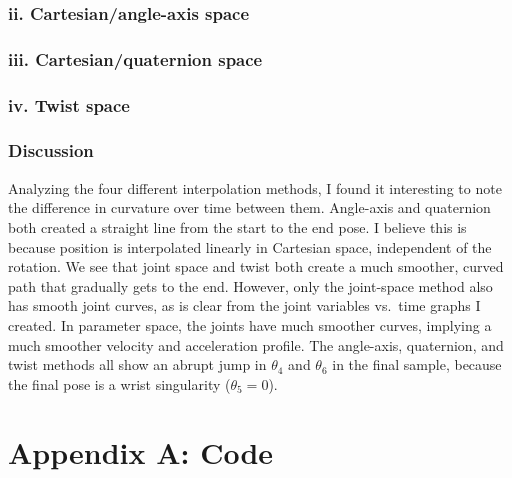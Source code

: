 \documentclass[11pt]{article}
\begin{document}
\subsubsection*{ii. Cartesian/angle-axis space}

\subsubsection*{iii. Cartesian/quaternion space}

\subsubsection*{iv. Twist space}

\subsubsection*{Discussion}

\begin{result}
Analyzing the four different interpolation methods, I found it interesting to note the difference in curvature over time between them. Angle-axis and quaternion both created a straight line from the start to the end pose. I believe this is because position is interpolated linearly in Cartesian space, independent of the rotation. We see that joint space and twist both create a much smoother, curved path that gradually gets to the end. However, only the joint-space method also has smooth joint curves, as is clear from the joint variables vs.\ time graphs I created. In parameter space, the joints have much smoother curves, implying a much smoother velocity and acceleration profile. The angle-axis, quaternion, and twist methods all show an abrupt jump in $\theta_4$ and $\theta_6$ in the final sample, because the final pose is a wrist singularity ($\theta_5 = 0$).
\end{result}

\bigskip
\newpage
\section*{Appendix A: Code}

\newcommand{\codelisting}[2]{%
    \IfFileExists{../Code/#1}{}%
    {\noindent\textcolor{gray!60}{\itshape [#1 not yet written]}}%
}
\newcommand{\funclisting}[2]{%
    \IfFileExists{../../../Functions/#1}{}%
    {\noindent\textcolor{gray!60}{\itshape [#1 not yet written]}}%
}
\end{document}
